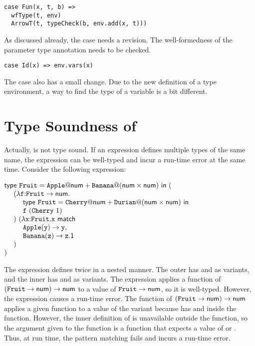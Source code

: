 \begin{verbatim}
case Fun(x, t, b) =>
  wfType(t, env)
  ArrowT(t, typeCheck(b, env.add(x, t)))
\end{verbatim}

As discussed already, the  case needs a revision.
The well-formedness of the parameter type annotation needs to be checked.

\begin{verbatim}
case Id(x) => env.vars(x)
\end{verbatim}

The  case also has a small change. Due to the new definition of a type
environment, a way to find the type of a variable is a bit different.

\section{Type Soundness of \Lang}

Actually, \Lang is not type sound. If an expression defines multiple types of
the same name, the expression can be well-typed and incur a run-time error at the
same time. Consider the following expression:

\vspace{0.5em}
$\begin{array}{@{}l}
  \etdef{\code{Fruit}}{\code{Apple}}{\tnum}{\code{Banana}}{(\tnum\times\tnum)}{( \\
  \ \ \ \ (\efunt{\cf}{\tarrow{\code{Fruit}}{\tnum}}{ \\
  \ \ \ \ \ \ \ \ \etdef{\code{Fruit}}{\code{Cherry}}{\tnum}{\code{Durian}}{(\tnum\times\tnum)}{ \\
  \ \ \ \ \ \ \ \ \cf\ (\code{Cherry}\ 1)} \\
  \ \ \ \ })\ (\efunt{\cx}{\code{Fruit}}{\ematch{\cx}{ \\
  \ \ \ \ \ \ \ \ \code{Apple}}{\cy}{\cy}{ \\
  \ \ \ \ \ \ \ \ \code{Banana}}{\cz}{\cz\textsf{.1}}} \\
  \ \ \ \ ) \\
  )}
\end{array}$
\vspace{0.5em}

The expression defines  twice in a nested manner. The outer
 has  and  as variants, and the inner
 has  and  as variants. The expression
applies a function of $(\texttt{Fruit}\rightarrow\textsf{num})\rightarrow\textsf{num}$ to a value
of ${\texttt{Fruit}\rightarrow\textsf{num}}$, so it is well-typed. However, the
expression causes a run-time error. The function of
$(\texttt{Fruit}\rightarrow\textsf{num})\rightarrow\textsf{num}$ applies a given function to a
value of the  variant because  has  and
 inside the function. However, the inner definition of
 is unavailable outside the function, so the argument given to the
function is a function that expects a value of  or .
Thus, at run time, the pattern matching fails and incurs a run-time error.

